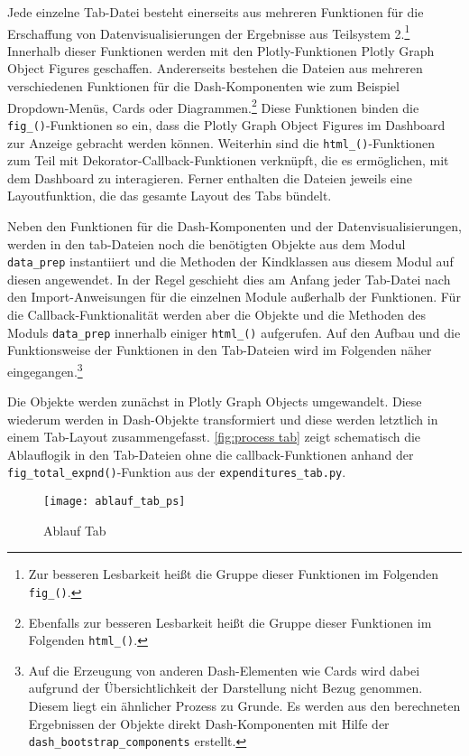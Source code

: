     Jede einzelne Tab-Datei besteht einerseits aus mehreren Funktionen für die Erschaffung von Datenvisualisierungen der
    Ergebnisse aus Teilsystem 2.\footnote{Zur besseren Lesbarkeit heißt die Gruppe dieser Funktionen im Folgenden \texttt{fig\_()}.}
    Innerhalb dieser Funktionen werden mit den Plotly-Funktionen Plotly Graph Object Figures geschaffen. 
    Andererseits bestehen die Dateien aus mehreren verschiedenen Funktionen für die Dash-Komponenten wie zum Beispiel Dropdown-Menüs, Cards oder Diagrammen.\footnote{Ebenfalls zur besseren Lesbarkeit
    heißt die Gruppe dieser Funktionen im Folgenden \texttt{html\_()}.}
    Diese Funktionen binden die \texttt{fig\_()}-Funktionen so ein, dass die Plotly Graph Object Figures im Dashboard zur Anzeige gebracht werden können. 
    Weiterhin sind die \texttt{html\_()}-Funktionen zum Teil mit Dekorator-Callback-Funktionen verknüpft, die es ermöglichen, mit dem Dashboard zu interagieren. 
    Ferner enthalten die Dateien jeweils eine Layoutfunktion, die das gesamte Layout des Tabs bündelt.

    Neben den Funktionen für die Dash-Komponenten und der Datenvisualisierungen, werden in den tab-Dateien noch die benötigten Objekte aus dem Modul \texttt{data\_prep} 
    instantiiert und die Methoden der Kindklassen aus diesem Modul auf diesen angewendet. In der Regel geschieht dies am Anfang 
    jeder Tab-Datei nach den Import-Anweisungen für die einzelnen Module außerhalb der Funktionen. Für die Callback-Funktionalität werden aber die Objekte und die Methoden des Moduls \texttt{data\_prep} innerhalb einiger \texttt{html\_()} aufgerufen.
    Auf den Aufbau und die Funktionsweise der Funktionen in den Tab-Dateien wird im Folgenden näher eingegangen.\footnote{Auf die Erzeugung von anderen Dash-Elementen wie Cards wird dabei aufgrund der Übersichtlichkeit der Darstellung nicht Bezug genommen. Diesem liegt ein ähnlicher Prozess
    zu Grunde. Es werden aus den berechneten Ergebnissen der Objekte direkt Dash-Komponenten mit Hilfe der \texttt{dash\_bootstrap\_components} erstellt.}
    
    Die Objekte werden zunächst in Plotly Graph Objects umgewandelt. Diese wiederum werden in Dash-Objekte transformiert und diese werden 
    letztlich in einem Tab-Layout zusammengefasst.
    \autoref{fig:process tab} zeigt schematisch die Ablauflogik in den Tab-Dateien ohne die callback-Funktionen anhand der 
    \texttt{fig\_total\_expnd()}-Funktion aus der \texttt{expenditures\_tab.py}.
    
    
    \begin{figure}[H]
        \centering
            \texttt{[image: ablauf\_tab\_ps]}
            \caption{Ablauf Tab}
            \label{fig:process tab}
    \end{figure}

